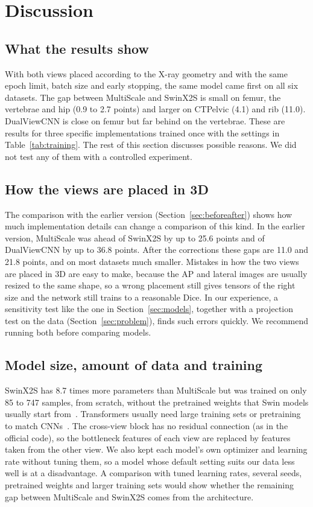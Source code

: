 \documentclass[11pt]{article}
\begin{document}
\section{Discussion}\label{sec:discussion}

\subsection{What the results show}
With both views placed according to the X-ray geometry and with the same epoch limit, batch size and early stopping, the same model came first on all six datasets. The gap between MultiScale and SwinX2S is small on femur, the vertebrae and hip (0.9 to 2.7 points) and larger on CTPelvic (4.1) and rib (11.0). DualViewCNN is close on femur but far behind on the vertebrae. These are results for three specific implementations trained once with the settings in Table~\ref{tab:training}. The rest of this section discusses possible reasons. We did not test any of them with a controlled experiment.

\subsection{How the views are placed in 3D}
The comparison with the earlier version (Section~\ref{sec:beforeafter}) shows how much implementation details can change a comparison of this kind. In the earlier version, MultiScale was ahead of SwinX2S by up to 25.6 points and of DualViewCNN by up to 36.8 points. After the corrections these gaps are 11.0 and 21.8 points, and on most datasets much smaller. Mistakes in how the two views are placed in 3D are easy to make, because the AP and lateral images are usually resized to the same shape, so a wrong placement still gives tensors of the right size and the network still trains to a reasonable Dice. In our experience, a sensitivity test like the one in Section~\ref{sec:models}, together with a projection test on the data (Section~\ref{sec:problem}), finds such errors quickly. We recommend running both before comparing models.

\subsection{Model size, amount of data and training}
SwinX2S has 8.7 times more parameters than MultiScale but was trained on only 85 to 747 samples, from scratch, without the pretrained weights that Swin models usually start from~\cite{swin2021}. Transformers usually need large training sets or pretraining to match CNNs~\cite{dosovitskiy2021}. The cross-view block has no residual connection (as in the official code), so the bottleneck features of each view are replaced by features taken from the other view. We also kept each model's own optimizer and learning rate without tuning them, so a model whose default setting suits our data less well is at a disadvantage. A comparison with tuned learning rates, several seeds, pretrained weights and larger training sets would show whether the remaining gap between MultiScale and SwinX2S comes from the architecture.
\end{document}
